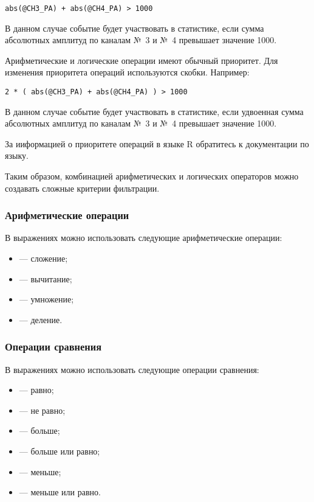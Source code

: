 \begin{lstlisting}
abs(@CH3_PA) + abs(@CH4_PA) > 1000
\end{lstlisting}

В данном случае событие будет участвовать в статистике, если сумма абсолютных амплитуд по каналам №~3 и №~4 превышает значение 1000.

\bigskip

Арифметические и логические операции имеют обычный приоритет. Для изменения приоритета операций используются скобки. Например:

\begin{lstlisting}
2 * ( abs(@CH3_PA) + abs(@CH4_PA) ) > 1000
\end{lstlisting}

В данном случае событие будет участвовать в статистике, если удвоенная сумма абсолютных амплитуд по каналам №~3 и №~4 превышает значение 1000.

За ииформацией о приоритете операций в языке R обратитесь к документации по языку.

\bigskip

Таким образом, комбинацией арифметических и логических операторов можно создавать сложные критерии фильтрации.

\subsubsection{Арифметические операции}

В выражениях можно использовать следующие арифметические операции:

\begin{itemize}
\item \CMDARG{+} --- сложение;
\item \CMDARG{-} --- вычитание;
\item \CMDARG{*} --- умножение;
\item \CMDARG{/} --- деление.
\end{itemize}

\subsubsection{Операции сравнения}

В выражениях можно использовать следующие операции сравнения:

\begin{itemize}
\item \CMDARG{==} --- равно;
\item \CMDARG{!=} --- не равно;
\item \CMDARG{>} --- больше;
\item \CMDARG{>=} --- больше или равно;
\item \CMDARG{<} --- меньше;
\item \CMDARG{<=} --- меньше или равно.
\end{itemize}

